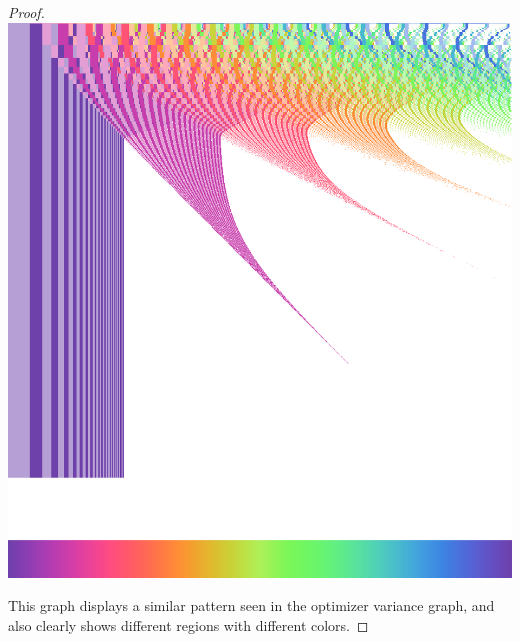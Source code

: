 \documentclass[]{article}
\begin{document}
\begin{proof}
	\includegraphics[scale=0.3]{web.png}
	
	This graph displays a similar pattern seen in the optimizer variance graph, and also clearly shows different regions with different colors.
\end{proof}
\end{document}
